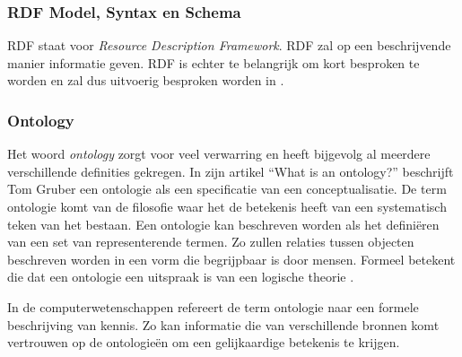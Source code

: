 \subsubsection{RDF Model, Syntax en Schema}
RDF staat voor \textit{Resource Description Framework}. RDF zal op een beschrijvende manier informatie geven. RDF is echter te belangrijk om kort besproken te worden en zal dus uitvoerig besproken worden in .

\subsubsection{Ontology}
\label{subsubsec:ontology}
Het woord \textit{ontology} zorgt voor veel verwarring en heeft bijgevolg al meerdere verschillende definities gekregen. In zijn artikel ``What is an ontology?'' beschrijft Tom Gruber een ontologie als een specificatie van een conceptualisatie. De term ontologie komt van de filosofie waar het de betekenis heeft van een systematisch teken van het bestaan. Een ontologie kan beschreven worden als het definiëren van een set van representerende termen. Zo zullen relaties tussen objecten beschreven worden in een vorm die begrijpbaar is door mensen. Formeel betekent die dat een ontologie een uitspraak is van een logische theorie \cite{gruber2018ontology}. 

In de computerwetenschappen refereert de term ontologie naar een formele beschrijving van kennis. Zo kan informatie die van verschillende bronnen komt vertrouwen op de ontologieën om een gelijkaardige betekenis te krijgen.